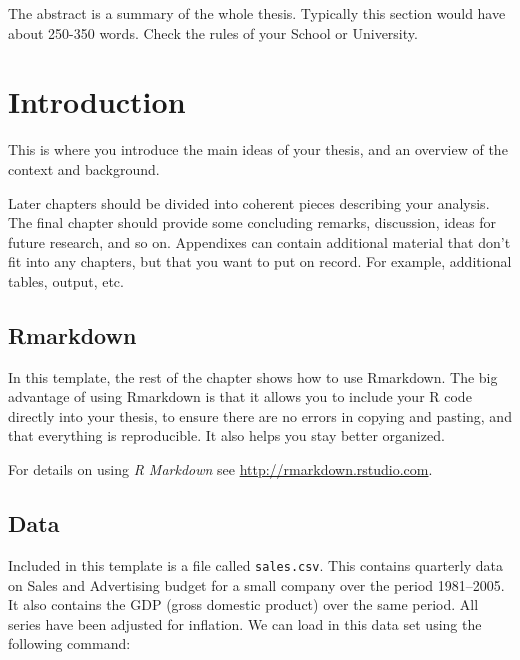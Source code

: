 \documentclass{sydneythesis}
\theoremstyle{definition}
\theoremstyle{definition}
\theoremstyle{definition}
\theoremstyle{remark}
\begin{document}
The abstract is a summary of the whole thesis. Typically this section
would have about 250-350 words. Check the rules of your School or
University.

\clearpage{}\setcounter{page}{0}

\chapter{Introduction}\label{ch:intro}

This is where you introduce the main ideas of your thesis, and an
overview of the context and background.

Later chapters should be divided into coherent pieces describing your
analysis. The final chapter should provide some concluding remarks,
discussion, ideas for future research, and so on. Appendixes can contain
additional material that don't fit into any chapters, but that you want
to put on record. For example, additional tables, output, etc.

\section{Rmarkdown}\label{rmarkdown}

In this template, the rest of the chapter shows how to use Rmarkdown.
The big advantage of using Rmarkdown is that it allows you to include
your R code directly into your thesis, to ensure there are no errors in
copying and pasting, and that everything is reproducible. It also helps
you stay better organized.

For details on using \emph{R Markdown} see
\url{http://rmarkdown.rstudio.com}.

\section{Data}\label{data}

Included in this template is a file called \texttt{sales.csv}. This
contains quarterly data on Sales and Advertising budget for a small
company over the period 1981--2005. It also contains the GDP (gross
domestic product) over the same period. All series have been adjusted
for inflation. We can load in this data set using the following command:

\begin{Shaded}
\begin{Highlighting}[]
\StringTok{ }\NormalTok{(}\NormalTok{(}\NormalTok{)[,}\OperatorTok{-}\NormalTok{], }\NormalTok{, }\NormalTok{)}
\end{Highlighting}
\end{Shaded}
\end{document}
